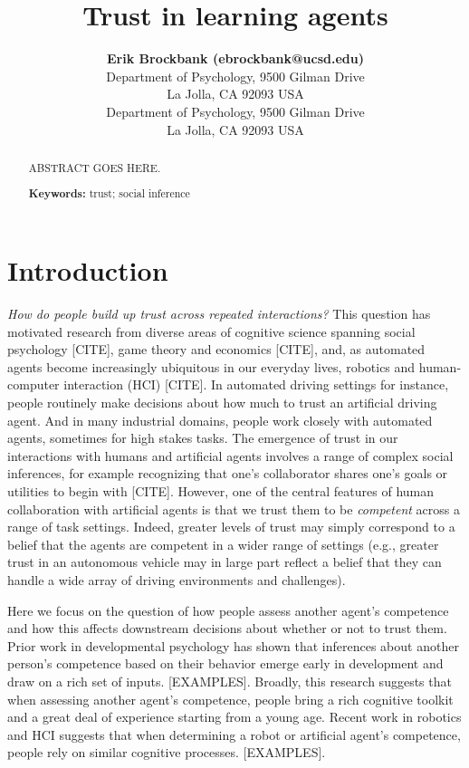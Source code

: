 \documentclass[10pt,letterpaper]{article}
\title{Trust in learning agents}
\author{{\large \bf Erik Brockbank (ebrockbank@ucsd.edu)} \\
  Department of Psychology, 9500 Gilman Drive \\
  La Jolla, CA 92093 USA
  \AND {\large \bf Judith Fan (jefan@ucsd.edu)} \\
  Department of Psychology, 9500 Gilman Drive \\
  La Jolla, CA 92093 USA}
\begin{document}
\maketitle


\begin{abstract}
ABSTRACT GOES HERE.

\textbf{Keywords:} 
trust; social inference
\end{abstract}


\section{Introduction}

\textit{How do people build up trust across repeated interactions?} This question has motivated research from diverse areas of cognitive science spanning social psychology [CITE], game theory and economics [CITE], and, as automated agents become increasingly ubiquitous in our everyday lives, robotics and human-computer interaction (HCI) [CITE]. 
In automated driving settings for instance, people routinely make decisions about how much to trust an artificial driving agent. And in many industrial domains, people work closely with automated agents, sometimes for high stakes tasks. The emergence of trust in our interactions with humans and artificial agents involves a range of complex social inferences, for example recognizing that one's collaborator shares one's goals or utilities to begin with [CITE]. However, one of the central features of human collaboration with artificial agents is that we trust them to be \textit{competent} across a range of task settings. Indeed, greater levels of trust may simply correspond to a belief that the agents are competent in a wider range of settings (e.g., greater trust in an autonomous vehicle may in large part reflect a belief that they can handle a wide array of driving environments and challenges).

Here we focus on the question of how people assess another agent's competence and how this affects downstream decisions about whether or not to trust them. Prior work in developmental psychology has shown that inferences about another person's competence based on their behavior emerge early in development and draw on a rich set of inputs. [EXAMPLES]. Broadly, this research suggests that when assessing another agent's competence, people bring a rich cognitive toolkit and a great deal of experience starting from a young age. Recent work in robotics and HCI suggests that when determining a robot or artificial agent's competence, people rely on similar cognitive processes. [EXAMPLES]. 
\end{document}
